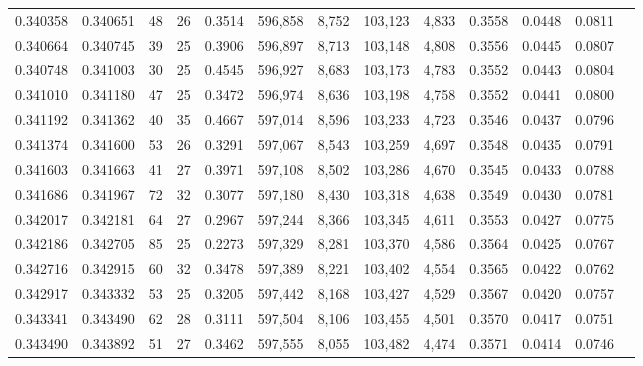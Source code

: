 \begin{tabular}{rrrrrrrrrrrrr}
0.340358 & 0.340651 &  48 &  26 &                                     0.3514 & 596,858 &   8,752 & 103,123 &   4,833 & 0.3558 & 0.0448 & 0.0811 \\
0.340664 & 0.340745 &  39 &  25 &                                     0.3906 & 596,897 &   8,713 & 103,148 &   4,808 & 0.3556 & 0.0445 & 0.0807 \\
0.340748 & 0.341003 &  30 &  25 &                                     0.4545 & 596,927 &   8,683 & 103,173 &   4,783 & 0.3552 & 0.0443 & 0.0804 \\
0.341010 & 0.341180 &  47 &  25 &                                     0.3472 & 596,974 &   8,636 & 103,198 &   4,758 & 0.3552 & 0.0441 & 0.0800 \\
0.341192 & 0.341362 &  40 &  35 &                                     0.4667 & 597,014 &   8,596 & 103,233 &   4,723 & 0.3546 & 0.0437 & 0.0796 \\
0.341374 & 0.341600 &  53 &  26 &                                     0.3291 & 597,067 &   8,543 & 103,259 &   4,697 & 0.3548 & 0.0435 & 0.0791 \\
0.341603 & 0.341663 &  41 &  27 &                                     0.3971 & 597,108 &   8,502 & 103,286 &   4,670 & 0.3545 & 0.0433 & 0.0788 \\
0.341686 & 0.341967 &  72 &  32 &                                     0.3077 & 597,180 &   8,430 & 103,318 &   4,638 & 0.3549 & 0.0430 & 0.0781 \\
0.342017 & 0.342181 &  64 &  27 &                                     0.2967 & 597,244 &   8,366 & 103,345 &   4,611 & 0.3553 & 0.0427 & 0.0775 \\
0.342186 & 0.342705 &  85 &  25 &                                     0.2273 & 597,329 &   8,281 & 103,370 &   4,586 & 0.3564 & 0.0425 & 0.0767 \\
0.342716 & 0.342915 &  60 &  32 &                                     0.3478 & 597,389 &   8,221 & 103,402 &   4,554 & 0.3565 & 0.0422 & 0.0762 \\
0.342917 & 0.343332 &  53 &  25 &                                     0.3205 & 597,442 &   8,168 & 103,427 &   4,529 & 0.3567 & 0.0420 & 0.0757 \\
0.343341 & 0.343490 &  62 &  28 &                                     0.3111 & 597,504 &   8,106 & 103,455 &   4,501 & 0.3570 & 0.0417 & 0.0751 \\
0.343490 & 0.343892 &  51 &  27 &                                     0.3462 & 597,555 &   8,055 & 103,482 &   4,474 & 0.3571 & 0.0414 & 0.0746 \\

\end{tabular}
